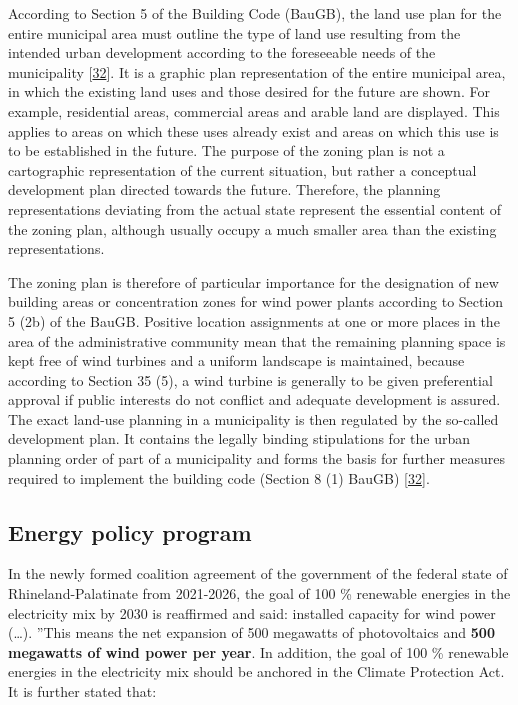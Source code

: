 \documentclass[a4paper,11pt]{article}
\begin{document}
According to Section 5 of the Building Code (BauGB), the land use plan for the entire municipal area must outline the type of land use resulting from the intended urban development according to the foreseeable needs of the municipality {[}\protect\hyperlink{ref-BundesministeriumderJustizundfurVerbraucherschutz.1960}{32}{]}. It is a graphic plan representation of the entire municipal area, in which the existing land uses and those desired for the future are shown. For example, residential areas, commercial areas and arable land are displayed. This applies to areas on which these uses already exist and areas on which this use is to be established in the future. The purpose of the zoning plan is not a cartographic representation of the current situation, but rather a conceptual development plan directed towards the future. Therefore, the planning representations deviating from the actual state represent the essential content of the zoning plan, although usually occupy a much smaller area than the existing representations.

The zoning plan is therefore of particular importance for the designation of new building areas or concentration zones for wind power plants according to Section 5 (2b) of the BauGB. Positive location assignments at one or more places in the area of the administrative community mean that the remaining planning space is kept free of wind turbines and a uniform landscape is maintained, because according to Section 35 (5), a wind turbine is generally to be given preferential approval if public interests do not conflict and adequate development is assured. The exact land-use planning in a municipality is then regulated by the so-called development plan. It contains the legally binding stipulations for the urban planning order of part of a municipality and forms the basis for further measures required to implement the building code (Section 8 (1) BauGB) {[}\protect\hyperlink{ref-BundesministeriumderJustizundfurVerbraucherschutz.1960}{32}{]}.

\hypertarget{energy-policy-program}{%
\subsection{Energy policy program}\label{energy-policy-program}}

In the newly formed coalition agreement of the government of the federal state of Rhineland-Palatinate from 2021-2026, the goal of 100 \% renewable energies in the electricity mix by 2030 is reaffirmed and said: installed capacity for wind power (\ldots). ''This means the net expansion of 500 megawatts of photovoltaics and \textbf{500 megawatts of wind power per year}. In addition, the goal of 100 \% renewable energies in the electricity mix should be anchored in the Climate Protection Act. It is further stated that:
\end{document}
